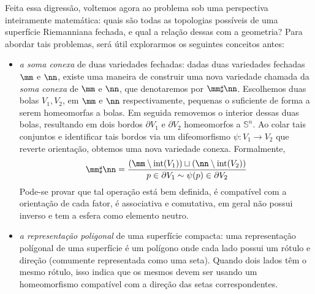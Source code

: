 Feita essa digressão, voltemos agora ao problema sob uma perspectiva inteiramente matemática: quais são todas as topologias possíveis de uma superfície Riemanniana fechada, e qual a relação dessas com a geometria? Para abordar tais problemas, será útil explorarmos os seguintes conceitos antes: 
\begin{itemize}
\item \emph{a soma conexa} de duas variedades fechadas: dadas duas variedades fechadas $\mm$ e $\nn$, existe uma maneira de construir uma nova variedade chamada da \emph{soma conexa} de $\mm$ e $\nn$, que denotaremos por $\mm \sharp \nn$. Escolhemos duas bolas $V_1, V_2$, em $\mm$ e $\nn$ respectivamente, pequenas o suficiente de forma a serem homeomorfas a bolas. Em seguida removemos o interior dessas duas bolas, resultando em dois bordos $\partial V_1$ e $\partial V_2$ homeomorfos a $\mathbb{S}^n$. Ao colar tais conjuntos e identificar tais bordos via um difeomorfismo $\psi: V_1 \to V_2$ que reverte orientação, obtemos uma nova variedade conexa. Formalmente, 
\[
\mm \sharp \nn = \frac{(\mm \setminus \text{int}(V_1)) \sqcup (\nn \setminus \text{int}(V_2))}{p \in \partial V_1 \sim \psi(p) \in \partial V_2}
\] Pode-se provar que tal operação está bem definida, é compatível com a orientação de cada fator, é associativa e comutativa, em geral não possui inverso e tem a esfera como elemento neutro. 
\iffalse Algumas visualizações úteis são as seguintes
\begin{figure}[H]
\centering
\texttt{[image: somaconexa.png]}
\caption{a soma conexa de um toro com um bi-toro}
\end{figure}
\begin{figure}[H]
\centering
\texttt{[image: SomaEsfera.png]}
\caption{a soma conexa de um toro com uma esfera}
\end{figure}
\fi
\item \emph{a representação poligonal} de uma superfície compacta: uma representação polígonal de uma superfície é um polígono onde cada lado possui um rótulo e direção (comumente representada como uma seta). Quando dois lados têm o mesmo rótulo, isso indica que os mesmos devem ser  usando um homeomorfismo compatível com a direção das setas correspondentes. 
\iffalse Por exemplo, 
\begin{figure}[H]
\centering
\texttt{[image: torojeff.png]}
\caption{a representação poligonal do toro $\mathbb{T}^2 = \mathbb{S}^1 \times \mathbb{S}^1$}
\end{figure}
\fi


\end{itemize}
